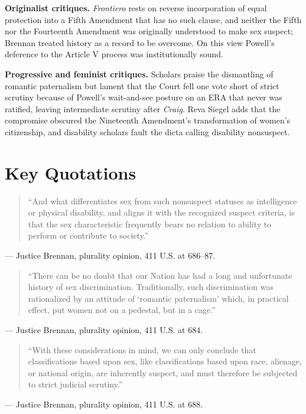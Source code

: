 \documentclass[12pt]{article}
\begin{document}
\textbf{Originalist critiques.} \textit{Frontiero} rests on reverse incorporation of equal protection into a Fifth Amendment that has no such clause, and neither the Fifth nor the Fourteenth Amendment was originally understood to make sex suspect; Brennan treated history as a record to be overcome. On this view Powell's deference to the Article V process was institutionally sound.

\textbf{Progressive and feminist critiques.} Scholars praise the dismantling of romantic paternalism but lament that the Court fell one vote short of strict scrutiny because of Powell's wait-and-see posture on an ERA that never was ratified, leaving intermediate scrutiny after \textit{Craig}. Reva Siegel adds that the compromise obscured the Nineteenth Amendment's transformation of women's citizenship, and disability scholars fault the dicta calling disability nonsuspect.

\section{Key Quotations}

\begin{quote}
``And what differentiates sex from such nonsuspect statuses as intelligence or physical disability, and aligns it with the recognized suspect criteria, is that the sex characteristic frequently bears no relation to ability to perform or contribute to society.''
\end{quote}
\noindent --- Justice Brennan, plurality opinion, 411 U.S. at 686--87.

\begin{quote}
``There can be no doubt that our Nation has had a long and unfortunate history of sex discrimination. Traditionally, such discrimination was rationalized by an attitude of `romantic paternalism' which, in practical effect, put women not on a pedestal, but in a cage.''
\end{quote}
\noindent --- Justice Brennan, plurality opinion, 411 U.S. at 684.

\begin{quote}
``With these considerations in mind, we can only conclude that classifications based upon sex, like classifications based upon race, alienage, or national origin, are inherently suspect, and must therefore be subjected to strict judicial scrutiny.''
\end{quote}
\noindent --- Justice Brennan, plurality opinion, 411 U.S. at 688.
\end{document}
